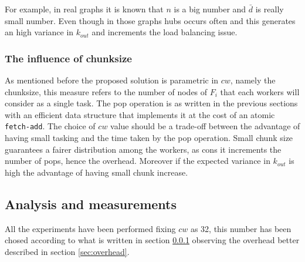 For example, in real graphs it is known that $n$ is a big number and $\bar{d}$ is really small number. Even though in those graphs hubs occurs often and this generates an high variance in $k_{out}$ and increments the load balancing issue.

\subsubsection{The influence of chunksize}
\label{sec:chunksize}
As mentioned before the proposed solution is parametric in $cw$, namely the chunksize, this measure refers to the number of nodes of $F_i$ that each workers will consider as a single task. The pop operation is as written in the previous sections with an efficient data structure that implements it at the cost of an atomic \texttt{fetch-add}. The choice of $cw$ value should be a trade-off between the advantage of having small tasking and the time taken by the pop operation. Small chunk size guarantees a fairer distribution among the workers, as cons it increments the number of pops, hence the overhead. Moreover if the expected variance in $k_{out}$ is high the advantage of having small chunk increase.
\subsection{Analysis and measurements}
All the experiments have been performed fixing $cw$ as 32, this number has been chosed according to what is written in section \ref{sec:chunksize} observing the overhead better described in section \ref{sec:overhead}.
